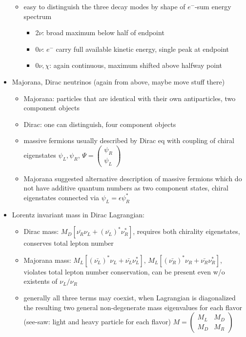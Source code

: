 \begin{itemize}
\begin{itemize}
\begin{itemize}
\end{itemize}
\item easy to distinguish the three decay modes by shape of \(e^-\)-sum energy spectrum
\begin{itemize}
\item 2\(\nu\): broad maximum below half of endpoint
\item 0\(\nu\): \(e^-\) carry full available kinetic energy, single peak at endpoint
\item 0\(\nu,\chi\): again continuous, maximum shifted above halfway point
\end{itemize}
\end{itemize}
\item Majorana, Dirac neutrinos (again from above, maybe move stuff there)
\begin{itemize}
\item Majorana: particles that are identical with their own antiparticles, two component objects
\item Dirac: one can distinguish, four component objects
\item massive fermions usually described by Dirac eq with coupling of chiral eigenstates \(\psi_L,\psi_R\), \(\Psi = \begin{pmatrix} \psi_R \\ \psi_L\end{pmatrix}\)
\item Majorana suggested alternative description of massive fermions which do not have additive quantum numbers as two component states, chiral eigenstates connected via \(\psi_L = \epsilon \psi_R^*\)
\end{itemize}
\item Lorentz invariant mass in Dirac Lagrangian:
\begin{itemize}
\item Dirac mass: \(M_D [\bar{\nu_R}\nu_L + (\bar{\nu_L})^*\nu_R^*]\), requires both chirality eigenstates, conserves total lepton number
\item Majorana mass: \(M_L [(\bar{\nu_L})^*\nu_L + \bar{\nu_L}\nu_L^*]\), \(M_L [(\bar{\nu_R})^*\nu_R + \bar{\nu_R}\nu_R^*]\), violates total lepton number conservation, can be present even w/o existents of \(\nu_L/\nu_R\)
\item generally all three terms may coexist, when Lagrangian is diagonalized the resulting two general non-degenerate mass eigenvalues for each flavor (see-saw: light and heavy particle for each flavor) \(M = \begin{pmatrix} M_L & M_D \\ M_D & M_R\end{pmatrix}\) 

\end{itemize}
\end{itemize}

